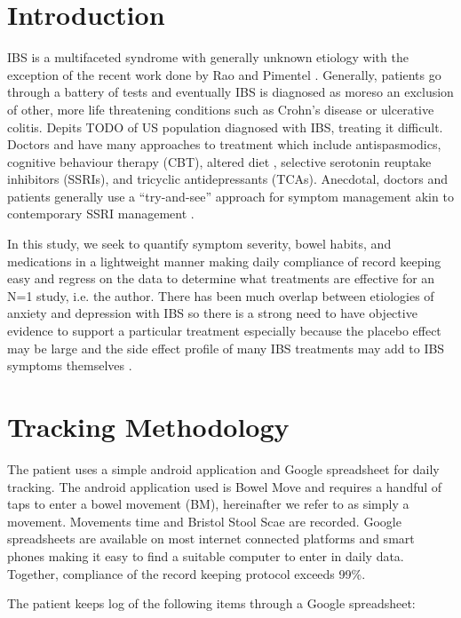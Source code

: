 \documentclass[conference]{IEEEtran}
\begin{document}
\section{Introduction}
IBS is a multifaceted syndrome with generally unknown etiology with the exception of the recent work done by Rao \cite{erdogan2015small} and Pimentel \cite{pimentel2000eradication}.  Generally, patients go through a battery of tests and eventually IBS is diagnosed as moreso an exclusion of other, more life threatening conditions such as Crohn's disease or ulcerative colitis.   Depits TODO of US population diagnosed with IBS, treating it difficult.  Doctors and have many approaches to treatment which include antispasmodics, cognitive behaviour therapy (CBT), altered diet \cite{gibson2010evidence}, selective serotonin reuptake inhibitors (SSRIs), and tricyclic antidepressants (TCAs). Anecdotal, doctors and patients generally use a “try-and-see” approach for symptom management akin to contemporary SSRI management \cite{trivedi2006evaluation}.

In this study, we seek to quantify symptom severity, bowel habits, and medications in a lightweight manner making daily compliance of record keeping easy and regress on the data to determine what treatments are effective for an N=1 study, i.e. the author.  There has been much overlap between etiologies of anxiety and depression with IBS so there is a strong need to have objective evidence to support a particular treatment especially because the placebo effect \cite{kaptchuk2008components} may be large and the side effect profile of many IBS treatments may add to IBS symptoms themselves \cite{vanderhoff2002proton}.

\section{Tracking Methodology}

The patient uses a simple android application and Google spreadsheet for daily tracking.  The android application used is Bowel Move \cite{bowelmove2017} and requires a handful of taps to enter a bowel movement (BM), hereinafter we refer to as simply a movement. Movements time and Bristol Stool Scae \cite{lewis1997stool} are recorded.  Google spreadsheets are available on most internet connected platforms and smart phones making it easy to find a suitable computer to enter in daily data.  Together, compliance of the record keeping protocol exceeds 99\%.

The patient keeps log of the following items through a Google spreadsheet:
\end{document}
